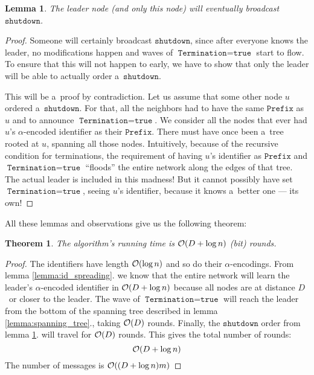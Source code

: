 \documentclass{article}
\newtheorem{lemma}{Lemma}
\newtheorem{theorem}{Theorem}
\DeclarePairedDelimiter{\parenthesesdelimiter}{(}{)}
\def\pars{\parenthesesdelimiter*}
\newcommand{\bigO}{\mathcal{O}}
\begin{document}
\begin{lemma}
\label{lemma:shutdown}
The leader node (and only this node) will eventually broadcast \(\texttt{shutdown}\).
\end{lemma}
\begin{proof}
Someone will certainly broadcast \(\texttt{shutdown}\), since after everyone knows the leader, no modifications happen and waves of \(\texttt{Termination} = \texttt{true}\) start to flow. To ensure that this will not happen to early, we have to show that only the leader will be able to actually order a~\(\texttt{shutdown}\).

This will be a~proof by contradiction. Let us assume that some other node \(u\) ordered a~\(\texttt{shutdown}\). For that, all the neighbors had to have the same \(\texttt{Prefix}\) as \(u\) and to announce \(\texttt{Termination} = \texttt{true}\). We consider all the nodes that ever had \(u\)'s \(\alpha\)-encoded identifier as their \(\texttt{Prefix}\). There must have once been a~tree rooted at \(u\), spanning all those nodes. Intuitively, because of the recursive condition for terminations, the requirement of having \(u\)'s identifier as \(\texttt{Prefix}\) and \(\texttt{Termination} = \texttt{true}\) ``floods'' the entire network along the edges of that tree. The actual leader is included in this madness! But it cannot possibly have set \(\texttt{Termination} = \texttt{true}\), seeing \(u\)'s identifier, because it knows a~better one --- its own!
\end{proof}

All these lemmas and observations give us the following theorem:
\begin{theorem}
The algorithm's running time is \(\bigO\pars{D + \log n}\) (bit) rounds.
\end{theorem}
\begin{proof}
The identifiers have length \(\bigO\pars{\log n}\) and so do their \(\alpha\)-encodings. From lemma \ref{lemma:id_spreading}. we know that the entire network will learn the leader's \(\alpha\)-encoded identifier in \(\bigO\pars{D + \log n}\) because all nodes are at distance \(D\)~or closer to the leader. The wave of \(\texttt{Termination} = \texttt{true}\) will reach the leader from the bottom of the spanning tree described in lemma \ref{lemma:spanning_tree}., taking \(\bigO\pars{D}\) rounds. Finally, the \(\texttt{shutdown}\) order from lemma \ref{lemma:shutdown}. will travel for \(\bigO\pars{D}\) rounds. This gives the total number of rounds:
\begin{equation*}
    \bigO\pars{D + \log n}
\end{equation*}
The number of messages is \(\bigO\pars{\pars{D + \log n}m}\)
\end{proof}



\end{document}
